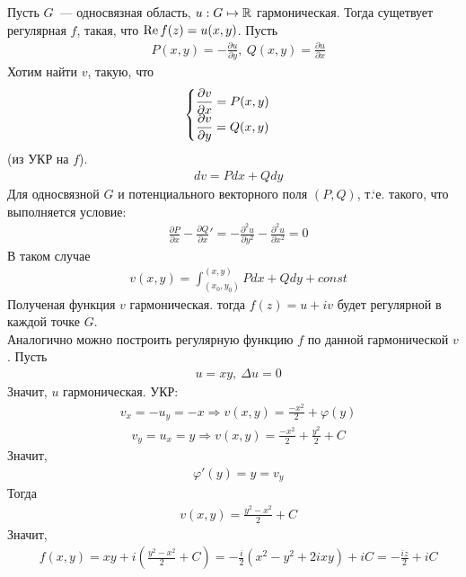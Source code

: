 \theorem
Пусть $G$~--- односвязная область, $u: G \mapsto \mathbb{R}$ гармоническая. Тогда
сущетвует регулярная $f$, такая, что $\mathrm{Re}\, f(z) = u(x,y)$.
\pr
Пусть
\begin{align*}
  & P(x,y) = -\frac{\partial u}{\partial y}, \ Q(x,y) = \frac{\partial u}{\partial x}
\end{align*}
Хотим найти $v$, такую, что
\begin{align*}
  & \left\{ \begin{matrix}
          \displaystyle \frac{\partial v}{\partial x} = P(x,y) \\
          \displaystyle \frac{\partial v}{\partial y} = Q(x,y) 
      \end{matrix} \right.
\end{align*}
(из УКР на $f$).
\begin{align*}
  & dv = Pdx+Qdy
\end{align*}
Для односвязной $G$ и потенциального векторного поля $(P,Q)$, т.`е. такого, что
выполняется условие:
\begin{align*}
  & \frac{\partial P}{\partial x} -\frac{\partial Q}{\partial x}' = - \frac{\partial^2 u}{\partial y^2} - \frac{\partial^2 u}{\partial x^2} = 0
\end{align*}
В таком случае
\begin{align*}
  & v(x,y) = \int_{(x_0,y_0)}^{(x,y)} P dx + Q dy + const
\end{align*}
Полученая функция $v$ гармоническая. тогда $f(z) = u+iv$ будет регулярной в
каждой точке $G$.
\\
Аналогично можно построить регулярную функцию $f$ по данной гармонической $v$.
\Example
Пусть
\begin{align*}
  & u = xy, \ \Delta u = 0
\end{align*}
Значит, $u$ гармоническая. УКР:
\begin{align*}
  & v_x = -u_y = -x \Rightarrow v(x,y) = \frac{-x^2}{2} + \varphi(y)
\end{align*}
\begin{align*}
  & v_y = u_x = y \Rightarrow v(x,y) = \frac{-x^2}{2} + \frac{y^2}{2} + C
\end{align*}
Значит,
\begin{align*}
  & \varphi'(y) = y = v_y
\end{align*}
Тогда
\begin{align*}
  & v(x,y) = \frac{y^2-x^2}{2} + C
\end{align*}
Значит,
\begin{align*}
  & f(x,y)= xy+i\left( \frac{y^2-x^2}{2} + C \right) = -\frac{i}{2} \left( x^2-y^2+2ixy \right) + iC = -\frac{iz}{2} + iC
\end{align*}
